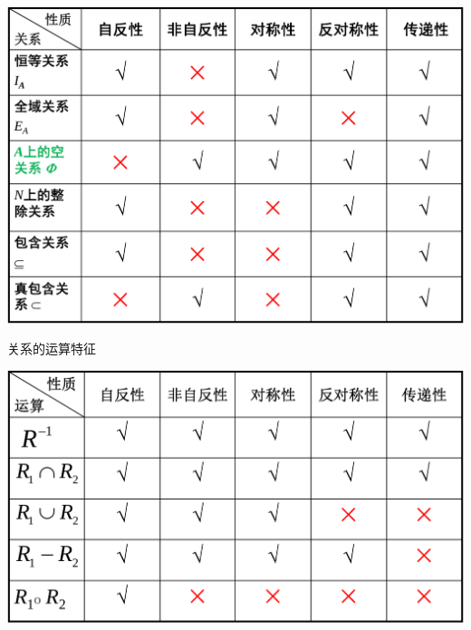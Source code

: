 \documentclass[11pt,a4paper,twocolumn,fleqn]{article} %
\begin{document}
\begin{enumerate}
\begin{table}[!htp]
 \includegraphics[width=\linewidth]{relationship-egs.pdf}
\end{table}
\begin{table}[!htp]
 \centering
 \caption{关系的运算特征}
 \includegraphics[width=\linewidth]{relationship-cal.pdf}
\end{table}
\end{enumerate}
\end{document}

